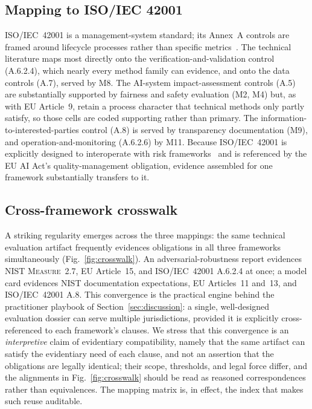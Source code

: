 \subsection{Mapping to ISO/IEC 42001}\label{sec:map-iso}
ISO/IEC~42001 is a management-system standard; its Annex~A controls are framed around
lifecycle processes rather than specific metrics~\cite{iso42001}. The technical
literature maps most directly onto the verification-and-validation control (A.6.2.4),
which nearly every method family can evidence, and onto the data controls (A.7), served
by M8. The AI-system impact-assessment controls (A.5) are substantially supported by
fairness and safety evaluation (M2, M4) but, as with EU Article~9, retain a process
character that technical methods only partly satisfy, so those cells are coded
supporting rather than primary. The information-to-interested-parties control
(A.8) is served by transparency documentation (M9), and operation-and-monitoring
(A.6.2.6) by M11. Because ISO/IEC~42001 is explicitly designed to interoperate with risk
frameworks~\cite{iso23894} and is referenced by the EU AI Act's quality-management
obligation, evidence assembled for one framework substantially transfers to it.

\subsection{Cross-framework crosswalk}\label{sec:crosswalk}
A striking regularity emerges across the three mappings: the same technical evaluation
artifact frequently evidences obligations in all three frameworks simultaneously
(Fig.~\ref{fig:crosswalk}). An adversarial-robustness report evidences NIST
\textsc{Measure}~2.7, EU Article~15, and ISO/IEC~42001 A.6.2.4 at once; a model card
evidences NIST documentation expectations, EU Articles~11 and~13, and ISO/IEC~42001 A.8.
This convergence is the practical engine behind the practitioner playbook of
Section~\ref{sec:discussion}: a single, well-designed evaluation dossier can serve
multiple jurisdictions, provided it is explicitly cross-referenced to each framework's
clauses. We stress that this convergence is an \emph{interpretive} claim of evidentiary
compatibility, namely that the same artifact can satisfy the evidentiary need of each clause, and
not an assertion that the obligations are legally identical; their scope, thresholds, and
legal force differ, and the alignments in Fig.~\ref{fig:crosswalk} should be read as
reasoned correspondences rather than equivalences. The mapping matrix is, in effect, the
index that makes such reuse auditable.
